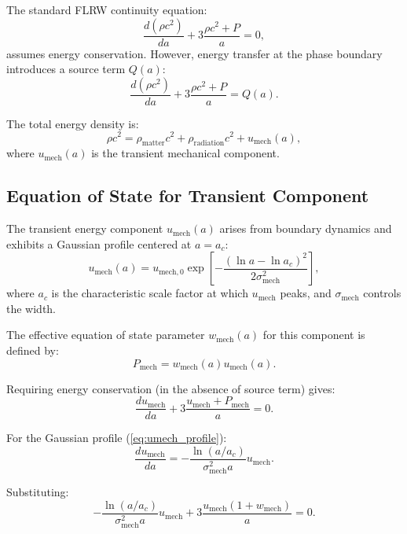 \documentclass[11pt,a4paper]{article}
\newcommand{\umech}{\ensuremath{u_{\mathrm{mech}}}}
\newcommand{\wmech}{\ensuremath{w_{\mathrm{mech}}}}
\theoremstyle{definition}
\theoremstyle{remark}
\begin{document}
The standard FLRW continuity equation:
\begin{equation}
\label{eq:continuity_standard}
\frac{d(\rho c^2)}{da} + 3\frac{\rho c^2 + P}{a} = 0,
\end{equation}
assumes energy conservation. However, energy transfer at the phase boundary introduces a source term $Q(a)$:
\begin{equation}
\label{eq:continuity_modified}
\boxed{\frac{d(\rho c^2)}{da} + 3\frac{\rho c^2 + P}{a} = Q(a).}
\end{equation}

The total energy density is:
\begin{equation}
\rho c^2 = \rho_{\mathrm{matter}}c^2 + \rho_{\mathrm{radiation}}c^2 + \umech(a),
\end{equation}
where $\umech(a)$ is the transient mechanical component.

\subsection{Equation of State for Transient Component}
\label{sec:wmech_derivation}

The transient energy component $\umech(a)$ arises from boundary dynamics and exhibits a Gaussian profile centered at $a = a_c$:
\begin{equation}
\label{eq:umech_profile}
\umech(a) = u_{\mathrm{mech},0} \exp\left[-\frac{(\ln a - \ln a_c)^2}{2\sigma_{\mathrm{mech}}^2}\right],
\end{equation}
where $a_c$ is the characteristic scale factor at which $\umech$ peaks, and $\sigma_{\mathrm{mech}}$ controls the width.

The effective equation of state parameter $\wmech(a)$ for this component is defined by:
\begin{equation}
P_{\mathrm{mech}} = \wmech(a)\umech(a).
\end{equation}

Requiring energy conservation (in the absence of source term) gives:
\begin{equation}
\frac{d\umech}{da} + 3\frac{\umech + P_{\mathrm{mech}}}{a} = 0.
\end{equation}

For the Gaussian profile (\ref{eq:umech_profile}):
\begin{equation}
\frac{d\umech}{da} = -\frac{\ln(a/a_c)}{\sigma_{\mathrm{mech}}^2 a}\umech.
\end{equation}

Substituting:
\begin{equation}
-\frac{\ln(a/a_c)}{\sigma_{\mathrm{mech}}^2 a}\umech + 3\frac{\umech(1 + \wmech)}{a} = 0.
\end{equation}
\end{document}
